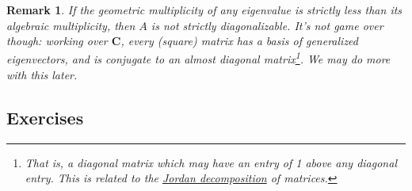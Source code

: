 \documentclass[12pt]{article}
\numberwithin{equation}{subsection}
\numberwithin{figure}{subsection}
\theoremstyle{note}
\newtheorem{remark}[subsection]{Remark}
\begin{document}
\begin{remark} 
	If the geometric multiplicity of any eigenvalue is strictly less than its algebraic multiplicity, then $A$ is not strictly diagonalizable. It's not game over though: working over $\mathbf{C}$, every (square) matrix has a basis of \textit{generalized eigenvectors}, and is conjugate to an \textit{almost diagonal} matrix\footnote{That is, a diagonal matrix which may have an entry of 1 above any diagonal entry. This is related to the \href{https://en.wikipedia.org/wiki/Jordan_normal_form}{Jordan decomposition} of matrices. }. We may do more with this later. 

\end{remark}

\subsection{Exercises} 
\end{document}
